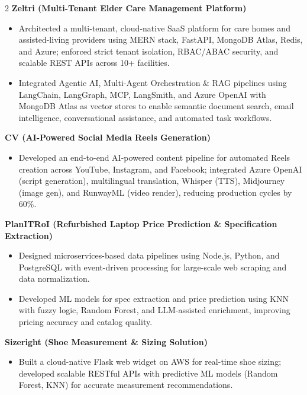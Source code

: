 \documentclass[10pt,a4paper]{article}
\newcommand{\project}[1]{%
  \vspace{2pt}
  {\fontsize{8.6}{10}\bfseries\color{sidebar}#1}\par
}
\begin{document}
\begin{paracol}{2}
\project{Zeltri (Multi-Tenant Elder Care Management Platform)}
\begin{itemize}
  \item Architected a multi-tenant, cloud-native SaaS platform for care homes and assisted-living providers using MERN stack, FastAPI, MongoDB Atlas, Redis, and Azure; enforced strict tenant isolation, RBAC/ABAC security, and scalable REST APIs across 10+ facilities.
  \item Integrated Agentic AI, Multi-Agent Orchestration \& RAG pipelines using LangChain, LangGraph, MCP, LangSmith, and Azure OpenAI with MongoDB Atlas as vector stores to enable semantic document search, email intelligence, conversational assistance, and automated task workflows.
\end{itemize}

\project{CV (AI-Powered Social Media Reels Generation)}
\begin{itemize}
  \item Developed an end-to-end AI-powered content pipeline for automated Reels creation across YouTube, Instagram, and Facebook; integrated Azure OpenAI (script generation), multilingual translation, Whisper (TTS), Midjourney (image gen), and RunwayML (video render), reducing production cycles by 60\%.
\end{itemize}

\project{PlanITRoI (Refurbished Laptop Price Prediction \& Specification Extraction)}
\begin{itemize}
  \item Designed microservices-based data pipelines using Node.js, Python, and PostgreSQL with event-driven processing for large-scale web scraping and data normalization.
  \item Developed ML models for spec extraction and price prediction using KNN with fuzzy logic, Random Forest, and LLM-assisted enrichment, improving pricing accuracy and catalog quality.
\end{itemize}

\project{Sizeright (Shoe Measurement \& Sizing Solution)}
\begin{itemize}
  \item Built a cloud-native Flask web widget on AWS for real-time shoe sizing; developed scalable RESTful APIs with predictive ML models (Random Forest, KNN) for accurate measurement recommendations.
\end{itemize}


\end{paracol}
\end{document}
